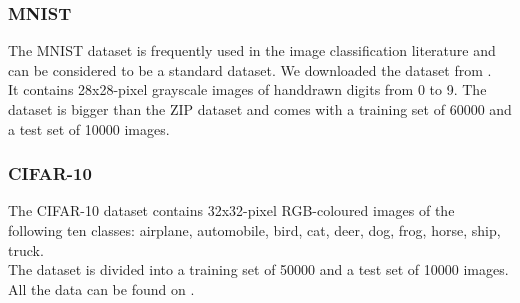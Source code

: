 \subsubsection{MNIST}

The MNIST dataset is frequently used in the image classification literature
and can be considered to be a standard dataset.
We downloaded the dataset from \cite{mnist}.\\
It contains 28x28-pixel grayscale images of handdrawn digits from 0 to 9.
The dataset is bigger than the ZIP dataset and comes with a training set of 60000 and a test set of 10000 images.


\subsubsection{CIFAR-10}

The CIFAR-10 dataset contains 32x32-pixel RGB-coloured images of the following ten classes:
airplane,
automobile,
bird,
cat,
deer,
dog,
frog,
horse,
ship,
truck.\\

The dataset is divided into a training set of 50000 and a test set of 10000 images.\\
All the data can be found on \cite{cifar10}.
